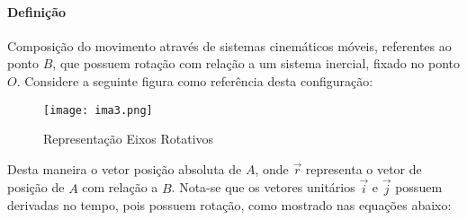 \documentclass{article}
\begin{document}
            \paragraph{Definição}Composição do movimento através de sistemas cinemáticos móveis, referentes ao ponto $B$, que possuem rotação com relação a um sistema inercial, fixado no ponto $O$. Considere a seguinte figura como referência desta configuração:
                \begin{figure}[H]
                    \centering
                    \texttt{[image: ima3.png]}
                    \caption{Representação Eixos Rotativos}
                \end{figure} \noindent
            Desta maneira o vetor posição absoluta de $A$, onde $\vec{r}$ representa o vetor de posição de $A$ com relação a $B$. Nota-se que os vetores unitários $\vec{i}$ e $\vec{j}$ possuem derivadas no tempo, pois possuem rotação, como mostrado nas equações abaixo:
\end{document}
